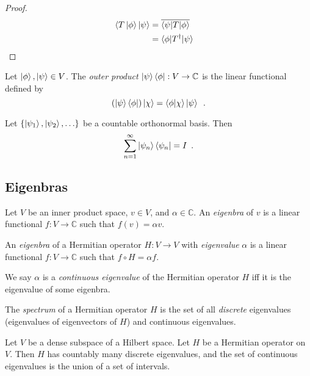\begin{proof}
\pf
\begin{align*}
\langle T \left| {\phi} \right\rangle | \psi \rangle & = \overline{\langle \psi | T | \phi \rangle} \\
& = \langle \phi | T^\dagger | \psi \rangle & \relax
\end{align*}
\end{proof}

\begin{df}
Let $\left| {\phi} \right\rangle, \left| {\psi} \right\rangle \in V$. The \emph{outer product} $\left| {\psi} \right\rangle \langle \phi | : V \rightarrow \mathbb{C}$ is the linear functional defined by
\[ (\left| {\psi} \right\rangle \langle \phi |) \left| {\chi} \right\rangle = \langle \phi | \chi \rangle \left| {\psi} \right\rangle \enspace . \]
\end{df}

\begin{prop}
Let $\{ \left| {\psi_1} \right\rangle, \left| {\psi_2} \right\rangle, \ldots \}$ be a countable orthonormal basis. Then
\[ \sum_{n=1}^\infty \left| {\psi_n} \right\rangle \langle \psi_n | = I \enspace . \]
\end{prop}

\subsection{Eigenbras}

\begin{df}[Eigenbra]
Let $V$ be an inner product space, $v \in V$, and $\alpha \in \mathbb{C}$. An \emph{eigenbra} of $v$ is a linear functional $f : V \rightarrow \mathbb{C}$ such that $f(v) = \alpha v$.

An \emph{eigenbra} of a Hermitian operator $H : V \rightarrow V$ with \emph{eigenvalue} $\alpha$ is a linear functional $f : V \rightarrow \mathbb{C}$ such that $f \circ H = \alpha f$.

We say $\alpha$ is a \emph{continuous eigenvalue} of the Hermitian operator $H$ iff it is the eigenvalue of some eigenbra.
\end{df}

\begin{df}[Spectrum]
The \emph{spectrum} of a Hermitian operator $H$ is the set of all \emph{discrete} eigenvalues (eigenvalues of eigenvectors of $H$) and continuous eigenvalues.
\end{df}

\begin{thm}
Let $V$ be a dense subspace of a Hilbert space. Let $H$ be a Hermitian operator on $V$. Then $H$ has countably many discrete eigenvalues, and the set of continuous eigenvalues is the union of a set of intervals.
\end{thm}

